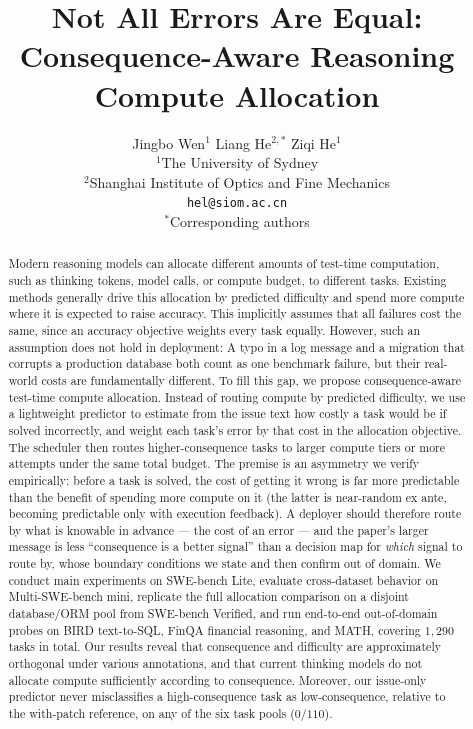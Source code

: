 \documentclass{article}
\title{Not All Errors Are Equal:\\Consequence-Aware Reasoning Compute Allocation}
\author{
Jingbo Wen$^{1}$ \quad
Liang He$^{2,\ast}$ \quad
Ziqi He$^{1}$ \\[4pt]
$^{1}$The University of Sydney \\
$^{2}$Shanghai Institute of Optics and Fine Mechanics \\[4pt]
\texttt{hel@siom.ac.cn} \\[2pt]
$^\ast$Corresponding authors
}
\begin{document}
\maketitle

\begin{abstract}
Modern reasoning models can allocate different amounts of test-time computation, such as thinking tokens, model calls, or compute budget, to different tasks. Existing methods generally drive this allocation by predicted difficulty and spend more compute where it is expected to raise accuracy. This implicitly assumes that all failures cost the same, since an accuracy objective weights every task equally. However, such an assumption does not hold in deployment: A typo in a log message and a migration that corrupts a production database both count as one benchmark failure, but their real-world costs are fundamentally different. 
To fill this gap,
we propose consequence-aware test-time compute allocation. Instead of routing compute by predicted difficulty, we use a lightweight predictor to estimate from the issue text how costly a task would be if solved incorrectly, and weight each task's error by that cost in the allocation objective. The scheduler then routes higher-consequence tasks to larger compute tiers or more attempts under the same total budget. The premise is an asymmetry we verify empirically: before a task is solved, the cost of getting it wrong is far more predictable than the benefit of spending more compute on it (the latter is near-random ex ante, becoming predictable only with execution feedback). A deployer should therefore route by what is knowable in advance --- the cost of an error --- and the paper's larger message is less ``consequence is a better signal'' than a decision map for \emph{which} signal to route by, whose boundary conditions we state and then confirm out of domain.
We conduct main experiments on SWE-bench Lite, evaluate cross-dataset behavior on Multi-SWE-bench mini, replicate the full allocation comparison on a disjoint database/ORM pool from SWE-bench Verified, and run end-to-end out-of-domain probes on BIRD text-to-SQL,
FinQA financial reasoning, and MATH, covering $1{,}290$ tasks in total. Our results reveal that consequence and difficulty are approximately orthogonal under various annotations, and that current thinking models do not allocate compute sufficiently according to consequence. Moreover, our issue-only predictor never misclassifies a high-consequence task as low-consequence, relative to the with-patch reference, on any of the six task pools ($0/110$). 

\end{abstract}
\end{document}
